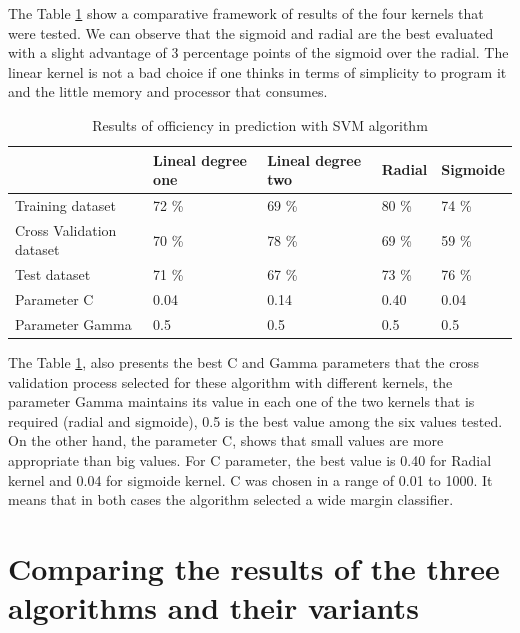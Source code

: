 \documentclass[]{book}
\begin{document}
The Table \ref{tab:results-of-efficiency-svm} show a comparative
framework of results of the four kernels that were tested. We can
observe that the sigmoid and radial are the best evaluated with a slight
advantage of 3 percentage points of the sigmoid over the radial. The
linear kernel is not a bad choice if one thinks in terms of simplicity
to program it and the little memory and processor that consumes.

\begin{table}[ht]
\centering
\caption{Results of officiency in prediction with SVM algorithm}
\label{tab:results-of-efficiency-svm}
\begin{tabular}{lllll}
\hline
                         & Lineal degree one & Lineal degree two & Radial & Sigmoide \\ \hline
Training dataset         & 72 \%             & 69 \%             & 80 \%  & 74 \%    \\
Cross Validation dataset & 70 \%             & 78 \%             & 69 \%  & 59 \%    \\
Test dataset             & 71 \%             & 67 \%             & 73 \%  & 76 \%    \\
Parameter C              & 0.04              & 0.14              & 0.40   & 0.04     \\
Parameter Gamma          & 0.5               & 0.5               & 0.5    & 0.5      \\ \hline
\end{tabular}
\end{table}

The Table \ref{tab:results-of-efficiency-svm}, also presents the best C
and Gamma parameters that the cross validation process selected for
these algorithm with different kernels, the parameter Gamma maintains
its value in each one of the two kernels that is required (radial and
sigmoide), 0.5 is the best value among the six values tested. On the
other hand, the parameter C, shows that small values are more
appropriate than big values. For C parameter, the best value is 0.40 for
Radial kernel and 0.04 for sigmoide kernel. C was chosen in a range of
0.01 to 1000. It means that in both cases the algorithm selected a wide
margin classifier.

\section{Comparing the results of the three algorithms and their
variants}\label{comparing-the-results-of-the-three-algorithms-and-their-variants}
\end{document}
